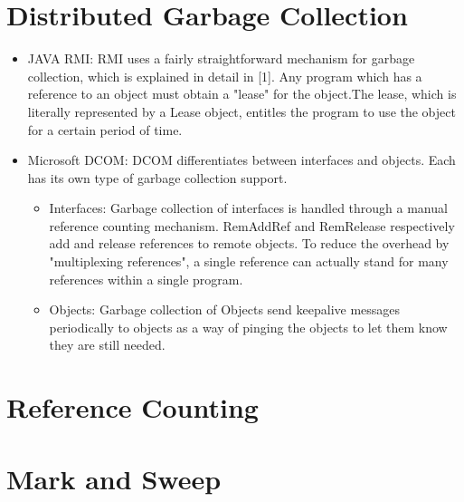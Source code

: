 \documentclass[a4paper, 14pt]{article}
\begin{document}
\section{Distributed Garbage Collection}
\begin{itemize}
\item JAVA RMI: RMI uses a fairly straightforward mechanism for garbage collection, which is explained in detail in [1]. Any program which has a reference to an object must obtain a "lease" for the object.The lease, which is literally represented by a Lease object, entitles the program to use the object for a certain period of time.

\item Microsoft DCOM: DCOM differentiates between interfaces and objects. Each has its own type of garbage collection support.
    \begin{itemize}
    \item Interfaces: Garbage collection of interfaces is handled through a manual reference counting mechanism. RemAddRef and RemRelease respectively add and release references to remote objects. To reduce the overhead by "multiplexing references", a single reference can actually stand for many references within a single program.
    \item Objects: Garbage collection of Objects send keepalive messages periodically to objects as a way of pinging the objects to let them know they are still needed.
    \end{itemize}
\end{itemize}

\section{Reference Counting}

\section{Mark and Sweep}


\newpage

{}
\end{document}
